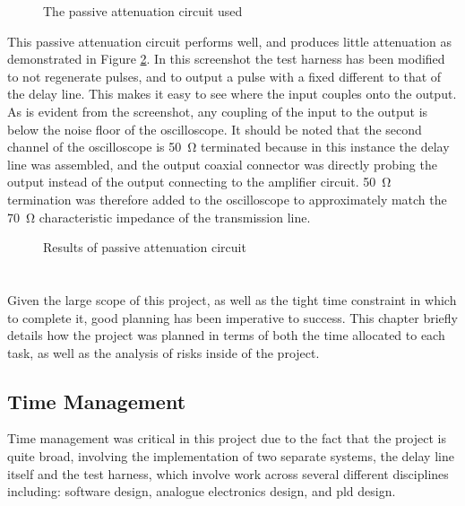 \begin{figure}[ht]
	\centering
	\caption{The passive attenuation circuit used}
	\label{fig:output-passive-attenuator}
\end{figure}

This passive attenuation circuit performs well, and produces little attenuation as demonstrated in Figure \ref{fig:final-breakthrough}. In this screenshot the test harness has been modified to not regenerate pulses, and to output a pulse with a fixed different to that of the delay line. This makes it easy to see where the input couples onto the output. As is evident from the screenshot, any coupling of the input to the output is below the noise floor of the oscilloscope. It should be noted that the second channel of the oscilloscope is \SI{50}{\ohm} terminated because in this instance the delay line was assembled, and the output coaxial connector was directly probing the output instead of the output connecting to the amplifier circuit. \SI{50}{\ohm} termination was therefore added to the oscilloscope to approximately match the \SI{70}{\ohm} characteristic impedance of the transmission line.

\begin{figure}[ht]
	\centering
	\caption{Results of passive attenuation circuit}
	\label{fig:final-breakthrough}
\end{figure}

\chapter{} \label{sec:project-planning}
Given the large scope of this project, as well as the tight time constraint in which to complete it, good planning has been imperative to success. This chapter briefly details how the project was planned in terms of both the time allocated to each task, as well as the analysis of risks inside of the project.


\section{Time Management}


Time management was critical in this project due to the fact that the project is quite broad, involving the implementation of two separate systems, the delay line itself and the test harness, which involve work across several different disciplines including: software design, analogue electronics design, and \gls{pld} design.

